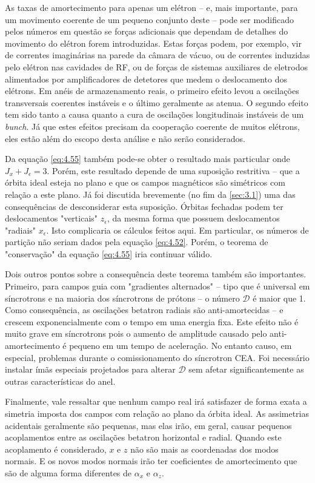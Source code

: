 As taxas de amortecimento para apenas um elétron -- e, mais importante, para um movimento coerente de um pequeno conjunto deste -- pode ser modificado pelos números em questão se forças adicionais que dependam de detalhes do movimento do elétron forem introduzidas. Estas forças podem, por exemplo, vir de correntes imaginárias na parede da câmara de vácuo, ou de correntes induzidas pelo elétron nas cavidades de RF, ou de forças de sistemas auxiliares de eletrodos alimentados por amplificadores de detetores  que medem o deslocamento dos elétrons. Em anéis de armazenamento reais, o primeiro efeito levou a oscilações transversais coerentes instáveis e o último geralmente as atenua. O segundo efeito tem sido tanto a causa quanto a cura de oscilações longitudinais instáveis de um \textit{bunch}. Já que estes efeitos precisam da cooperação coerente de muitos elétrons, eles estão além do escopo desta análise e não serão considerados.

Da equação \eqref{eq:4.55} também pode-se obter o resultado mais particular onde $J_x + J_\epsilon=3$. Porém, este resultado depende de uma suposição restritiva -- que a órbita ideal esteja no plano e que os campos magnéticos são simétricos com relação a este plano. Já foi discutida brevemente (no fim da \autoref{sec:3.1}) uma das consequências de desconsiderar esta suposição. Órbitas fechadas podem ter deslocamentos "verticais" $z_\epsilon$, da mesma forma que possuem deslocamentos "radiais" $x_\epsilon$. Isto complicaria os cálculos feitos aqui. Em particular, os números de partição não seriam dados pela equação \eqref{eq:4.52}. Porém, o teorema de "conservação" da equação \eqref{eq:4.55} iria continuar válido.

Dois outros pontos sobre a consequência deste teorema também são importantes. Primeiro, para campos guia com "gradientes alternados" -- tipo que é universal em síncrotrons e na maioria dos síncrotrons de prótons -- o número $\mathscr{D}$ é maior que 1. Como consequência, as oscilações betatron radiais são anti-amortecidas -- e crescem exponencialmente com o tempo em uma energia fixa. Este efeito não é muito grave em síncrotrons pois o aumento de amplitude causado pelo anti-amortecimento é pequeno em um tempo de aceleração. No entanto causo, em especial, problemas durante o comissionamento do síncrotron CEA. Foi necessário instalar ímãs especiais projetados para alterar $\mathscr{D}$ sem afetar significantemente as outras características do anel.

Finalmente, vale ressaltar que nenhum campo real irá satisfazer de forma exata a simetria imposta dos campos com relação ao plano da órbita ideal. As assimetrias acidentais geralmente são pequenas, mas elas irão, em geral, causar pequenos acoplamentos entre as oscilações betatron horizontal e radial. Quando este acoplamento é considerado, $x$ e $z$ não são mais as coordenadas dos modos normais. E os novos modos normais irão ter coeficientes de amortecimento que são de alguma forma diferentes de $\alpha_x$ e $\alpha_z$.